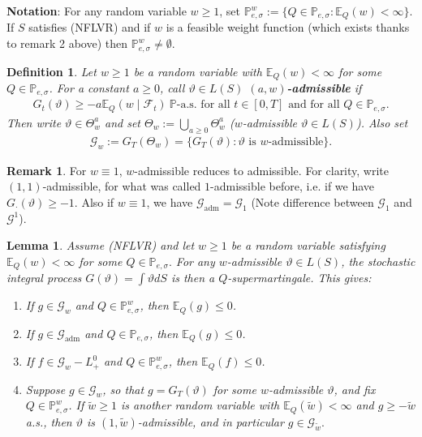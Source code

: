 \documentclass[12pt,a4paper, twoside]{article}
\newtheorem{lem}{Lemma}[section]
\newtheorem{defn}{Definition}[section]
\theoremstyle{definition}
\newtheorem{rem}{Remark}[section]
\newcommand{\EE}{\mathbb{E}} %
\newcommand{\PP}{\mathbb{P}} %
\begin{document}
\newpage
\noindent \textbf{Notation}: For any random variable $w \geq 1$, set $
\PP_{e, \sigma}^w := \{ Q \in \PP_{e, \sigma} : \EE_Q(w) < \infty \}.
$
If $S$ satisfies (NFLVR) and if $w$ is a feasible weight function (which exists thanks to remark 2 above) then $\PP_{e, \sigma}^w \neq \emptyset$.
\begin{defn} Let $w \geq 1$ be a random variable with $\EE_Q(w) < \infty$ for some $Q \in \PP_{e,  \sigma}$. For a constant $a \geq 0$, call $\vartheta \in L(S)$ \textbf{$(a,w)$-admissible} if 
\begin{align*}
G_t( \vartheta) \geq -a \EE_Q(w \mid \mathcal{F}_t) \ \PP\text{-a.s. for all } t \in [0,T] \text{ and for all } Q \in \PP_{e, \sigma}. 
\end{align*}
Then write $\vartheta \in \Theta_w^a$ and set $\Theta_w:= \bigcup_{a \geq 0 } \Theta_w^a$ ($w$-admissible $\vartheta \in L(S)$). Also set
\begin{align*}
\mathcal{G}_w:= G_T( \Theta_w)= \{ G_T( \vartheta) : \vartheta \text{ is $w$-admissible}\}.
\end{align*}
\end{defn}
\begin{rem} For $w \equiv 1$, $w$-admissible reduces to admissible. For clarity, write $(1,1)$-admissible, for what was called $1$-admissible before,  i.e. if we have $G_\cdot ( \vartheta) \geq -1$. Also if $w \equiv 1$, we have $\mathcal{G}_\text{adm}= \mathcal{G}_1$ (Note difference between $\mathcal{G}_1$ and $\mathcal{G}^1$). 
\end{rem}
\begin{lem} \label{L81} Assume (NFLVR) and let $w \geq 1$ be a random variable satisfying $\mathbb{E}_Q(w) < \infty$ for some $Q \in \PP_{e, \sigma}.$ For any $w$-admissible $\vartheta \in L(S)$, the stochastic integral process $G( \vartheta) = \int \vartheta dS$ is then a $Q$-supermartingale. This gives:
\begin{enumerate}
\item If $g \in \mathcal{G}_w$ and $Q \in \PP_{e, \sigma}^w$, then $\EE_Q(g) \leq 0$. 
\item If $g \in \mathcal{G}_\text{adm}$ and $Q \in \PP_{e, \sigma}$, then $\EE_Q(g) \leq 0$. 
\item If $f \in \mathcal{G}_w-L_+^0$ and $Q \in \PP_{e, \sigma}^w$, then $\EE_Q(f) \leq 0$. 
\item Suppose $g \in \mathcal{G}_w$, so that $g= G_T( \vartheta)$ for some $w$-admissible $\vartheta$, and fix $Q \in \PP_{e, \sigma}^w$. If $\widetilde{w} \geq 1$ is another random variable with $\EE_Q( \widetilde{w}) < \infty$ and $g \geq - \widetilde{w}$ a.s., then $\vartheta$ is $(1, \widetilde{w})$-admissible, and in particular $g \in \mathcal{G}_{\widetilde{w}}.$
\end{enumerate}
\end{lem}
\end{document}
